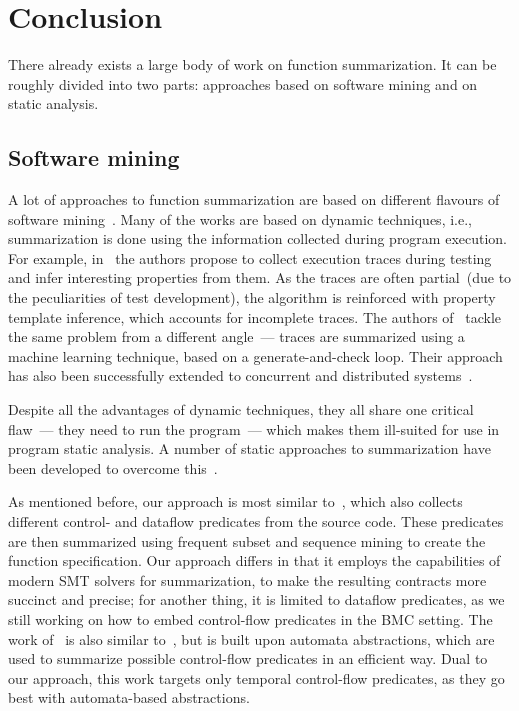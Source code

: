\section{Conclusion}\label{sec:related-work}

There already exists a large body of work on function summarization. It can be roughly divided into two parts: approaches based on software mining and on static analysis.

\subsection{Software mining}

A lot of approaches to function summarization are based on different flavours of software mining~\cite{Perracotta,Daikon,AssertsFromTraces,PredicateMining,AutomataMining}. Many of the works are based on dynamic techniques, i.e., summarization is done using the information collected during program execution. For example, in~\cite{Perracotta} the authors propose to collect execution traces during testing and infer interesting properties from them. As the traces are often partial~(due to the peculiarities of test development), the algorithm is reinforced with property template inference, which accounts for incomplete traces. The authors of~\cite{Daikon} tackle the same problem from a different angle~--- traces are summarized using a machine learning technique, based on a generate-and-check loop. Their approach has also been successfully extended to concurrent and distributed systems~\cite{CSight}.

Despite all the advantages of dynamic techniques, they all share one critical flaw~--- they need to run the program~--- which makes them ill-suited for use in program static analysis. A number of static approaches to summarization have been developed to overcome this~\cite{PredicateMining,AutomataMining}.

As mentioned before, our approach is most similar to~\cite{PredicateMining}, which also collects different control- and dataflow predicates from the source code. These predicates are then summarized using frequent subset and sequence mining to create the function specification. Our approach differs in that it employs the capabilities of modern SMT solvers for summarization, to make the resulting contracts more succinct and precise; for another thing, it is limited to dataflow predicates, as we still working on how to embed control-flow predicates in the BMC setting. The work of~\cite{AutomataMining} is also similar to~\cite{PredicateMining}, but is built upon automata abstractions, which are used to summarize possible control-flow predicates in an efficient way. Dual to our approach, this work targets only temporal control-flow predicates, as they go best with automata-based abstractions.

